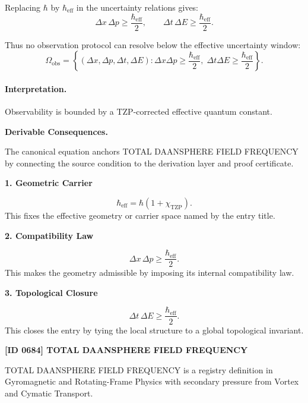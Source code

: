 Replacing $\hbar$ by $\hbar_{\mathrm{eff}}$ in the uncertainty relations gives:
\begin{equation}
\Delta x\,\Delta p
\geq
\frac{\hbar_{\mathrm{eff}}}{2},
\qquad
\Delta t\,\Delta E
\geq
\frac{\hbar_{\mathrm{eff}}}{2}.
\end{equation}

Thus no observation protocol can resolve below the effective uncertainty window:
\begin{equation}
\boxed{
\Omega_{\mathrm{obs}}
=
\left\{
(\Delta x,\Delta p,\Delta t,\Delta E):
\Delta x\Delta p\geq \frac{\hbar_{\mathrm{eff}}}{2},
\;
\Delta t\Delta E\geq \frac{\hbar_{\mathrm{eff}}}{2}
\right\}.
}
\end{equation}

\paragraph{Interpretation.}
Observability is bounded by a TZP-corrected effective quantum constant.

\par\vspace{0.35em}
\noindent\textbf{Derivable Consequences.}\quad
\begingroup
\footnotesize
\raggedright
The canonical equation anchors TOTAL DAANSPHERE FIELD FREQUENCY by connecting the source condition to the derivation layer and proof certificate.
\par\endgroup

\noindent\textbf{1. Geometric Carrier}\par
\[
\hbar_{\mathrm{eff}} = \hbar(1+\chi_{\mathrm{TZP}}).
\]
\noindent This fixes the effective geometry or carrier space named by the entry title.\par
\noindent\textbf{2. Compatibility Law}\par
\[
\Delta x\,\Delta p \geq \frac{\hbar_{\mathrm{eff}}}{2}.
\]
\noindent This makes the geometry admissible by imposing its internal compatibility law.\par
\noindent\textbf{3. Topological Closure}\par
\[
\Delta t\,\Delta E \geq \frac{\hbar_{\mathrm{eff}}}{2}.
\]
\noindent This closes the entry by tying the local structure to a global topological invariant.\par

\clearpage
\noindent\textbf{[ID 0684] TOTAL DAANSPHERE FIELD FREQUENCY}\par
\vspace{0.35em}
\begingroup\small
{}
TOTAL DAANSPHERE FIELD FREQUENCY is a registry definition in Gyromagnetic and Rotating-Frame Physics with secondary pressure from Vortex and Cymatic Transport.

